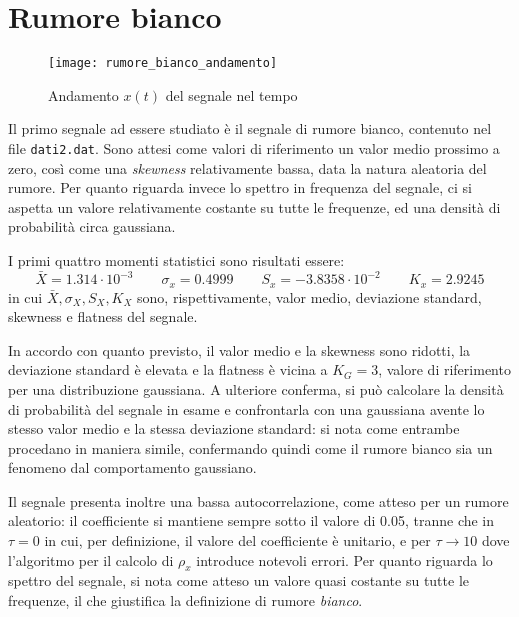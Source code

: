\documentclass{article} %
\begin{document}
\section{Rumore bianco}
\begin{figure}[ht!]
	\centering
	\texttt{[image: rumore\_bianco\_andamento]}
	\caption{Andamento $x(t)$ del segnale nel tempo}
\end{figure}
Il primo segnale ad essere studiato è il segnale di rumore bianco, contenuto nel file \texttt{dati2.dat}. Sono attesi come valori di riferimento un valor medio prossimo a zero, così come una \textit{skewness} relativamente bassa, data la natura aleatoria del rumore. Per quanto riguarda invece lo spettro in frequenza del segnale, ci si aspetta un valore relativamente costante su tutte le frequenze, ed una densità di probabilità circa gaussiana.\par
I primi quattro momenti statistici sono risultati essere:
$$\bar{X} = 1.314\cdot10^{-3} \qquad \sigma_{x} = 0.4999 \qquad S_{x} = -3.8358\cdot10^{-2} \qquad K_{x} = 2.9245$$
in cui $\bar{X}, \sigma_{X}, S_{X}, K_{X}$ sono, rispettivamente, valor medio, deviazione standard, skewness e flatness del segnale.\par
In accordo con quanto previsto, il valor medio e la skewness sono ridotti, la deviazione standard è elevata e la flatness è vicina a $K_{G} = 3$, valore di riferimento per una distribuzione gaussiana. A ulteriore conferma, si può calcolare la densità di probabilità del segnale in esame e confrontarla con una gaussiana avente lo stesso valor medio e la stessa deviazione standard: si nota come entrambe procedano in maniera simile, confermando quindi come il rumore bianco sia un fenomeno dal comportamento gaussiano.\par
Il segnale presenta inoltre una bassa autocorrelazione, come atteso per un rumore aleatorio: il coefficiente si mantiene sempre sotto il valore di 0.05, tranne che in $\tau = 0$ in cui, per definizione, il valore del coefficiente è unitario, e per $\tau \to 10$ dove l'algoritmo per il calcolo di $\rho_x$ introduce notevoli errori. Per quanto riguarda lo spettro del segnale, si nota come atteso un valore quasi costante su tutte le frequenze, il che giustifica la definizione di rumore \textit{bianco}.
\end{document}

